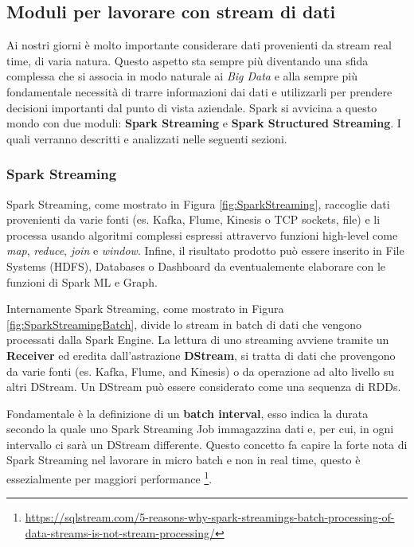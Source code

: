 \documentclass[12pt,italian]{article}
\begin{document}
\subsection{Moduli per lavorare con stream di dati}
Ai nostri giorni è molto importante considerare dati provenienti da stream real time, di varia natura. Questo aspetto sta sempre più diventando una sfida complessa che si associa in modo naturale ai \textit{Big Data} e alla sempre più fondamentale necessità di trarre informazioni dai dati e utilizzarli per prendere decisioni importanti dal punto di vista aziendale. \newline
Spark si avvicina a questo mondo con due moduli: \textbf{Spark Streaming} e \textbf{Spark Structured Streaming}. I quali verranno descritti e analizzati nelle seguenti sezioni.
\subsubsection{Spark Streaming}
Spark Streaming, come mostrato in Figura \ref{fig:SparkStreaming}, raccoglie dati provenienti da varie fonti (es. Kafka, Flume, Kinesis o TCP sockets, file) e li processa usando algoritmi complessi espressi attravervo funzioni high-level come \textit{map}, \textit{reduce}, \textit{join} e \textit{window}. Infine, il risultato prodotto può essere inserito in File Systems (HDFS), Databases o Dashboard da eventualemente elaborare con le funzioni di Spark ML e Graph.

\par Internamente Spark Streaming, come mostrato in  Figura \ref{fig:SparkStreamingBatch}, divide lo stream in batch di dati che vengono processati dalla Spark Engine.
\newline
La lettura di uno streaming avviene tramite un \textbf{Receiver} ed eredita dall'astrazione \textbf{DStream}, si tratta di dati che provengono da varie fonti (es. Kafka, Flume, and Kinesis) o da operazione ad alto livello su altri DStream.
Un DStream può essere considerato come una sequenza di RDDs.

Fondamentale è la definizione di un \textbf{batch interval}, esso indica la durata secondo la quale uno Spark Streaming Job immagazzina dati e, per cui, in ogni intervallo ci sarà un DStream differente.
Questo concetto fa capire la forte nota di Spark Streaming nel lavorare in micro batch e non in real time, questo è essezialmente per maggiori performance \footnote{\url{https://sqlstream.com/5-reasons-why-spark-streamings-batch-processing-of-data-streams-is-not-stream-processing/}}.
\end{document}
